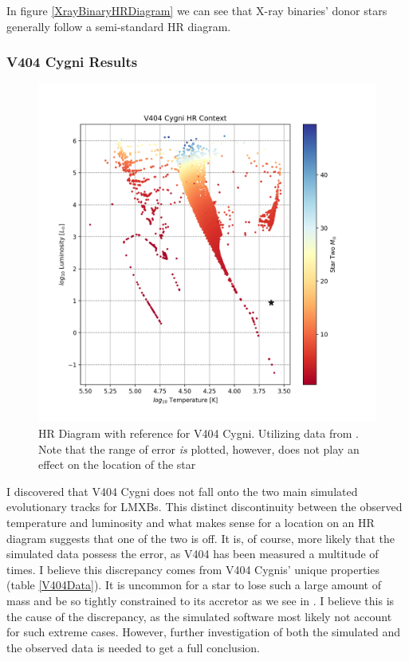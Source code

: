 \documentclass[12pt, a4paper]{article}
\begin{document}
        In figure \ref{XrayBinaryHRDiagram} we can see that X-ray binaries' donor stars generally follow a semi-standard HR diagram. 
        \subsubsection{V404 Cygni Results} \label{V404Results}
            \begin{figure}[H] 
                \centering
                \includegraphics[scale = .6]{figs/GeneratedFigs/V404_Cygni/V404XBsPopulationHRComp.png}
                \caption{HR Diagram with reference for V404 Cygni. Utilizing data from \parencite{Bartolomeo_2023}. Note that the range of error \textit{is} plotted, however, does not play an effect on the location of the star}
                \label{V404Context}
            \end{figure}

            I discovered that V404 Cygni does not fall onto the two main simulated evolutionary tracks for LMXBs. This distinct discontinuity between the observed temperature and luminosity and what makes sense for a location on an HR diagram suggests that one of the two is off. It is, of course, more likely that the simulated data possess the error, as V404 has been measured a multitude of times. I believe this discrepancy comes from V404 Cygnis' unique properties (table \ref{V404Data}). It is uncommon for a star to lose such a large amount of mass and be so tightly constrained to its accretor as we see in \parencite{Bartolomeo_2023}. I believe this is the cause of the discrepancy, as the simulated software most likely not account for such extreme cases. However, further investigation of both the simulated and the observed data is needed to get a full conclusion. 
\end{document}
